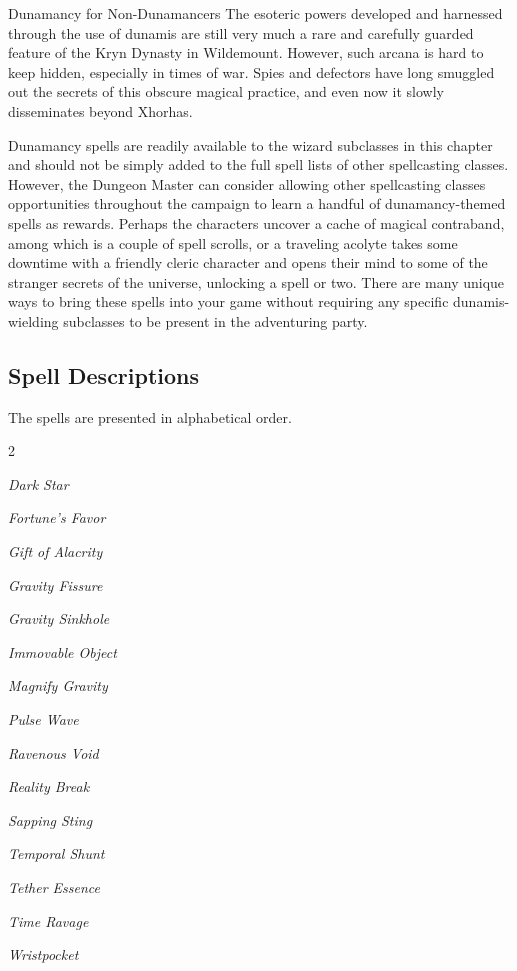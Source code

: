 \documentclass[10pt,a4paper,twoside,bg=print,twocolumn,openany,nodeprecatedcode]{dndbook}
\begin{document}
\begin{DndSidebar}[float=!b]{Dunamancy for Non-Dunamancers}
The esoteric powers developed and harnessed through the use of dunamis are still very much a rare and carefully guarded feature of the Kryn Dynasty in Wildemount. However, such arcana is hard to keep hidden, especially in times of war. Spies and defectors have long smuggled out the secrets of this obscure magical practice, and even now it slowly disseminates beyond Xhorhas.



Dunamancy spells are readily available to the wizard subclasses in this chapter and should not be simply added to the full spell lists of other spellcasting classes. However, the Dungeon Master can consider allowing other spellcasting classes opportunities throughout the campaign to learn a handful of dunamancy-themed spells as rewards. Perhaps the characters uncover a cache of magical contraband, among which is a couple of spell scrolls, or a traveling acolyte takes some downtime with a friendly cleric character and opens their mind to some of the stranger secrets of the universe, unlocking a spell or two. There are many unique ways to bring these spells into your game without requiring any specific dunamis-wielding subclasses to be present in the adventuring party.



\end{DndSidebar}

\subsection{Spell Descriptions}
The spells are presented in alphabetical order.


\begin{itemize}
\begin{multicols}{2}
\item \textit{Dark Star}
\item \textit{Fortune's Favor}
\item \textit{Gift of Alacrity}
\item \textit{Gravity Fissure}
\item \textit{Gravity Sinkhole}
\item \textit{Immovable Object}
\item \textit{Magnify Gravity}
\item \textit{Pulse Wave}
\item \textit{Ravenous Void}
\item \textit{Reality Break}
\item \textit{Sapping Sting}
\item \textit{Temporal Shunt}
\item \textit{Tether Essence}
\item \textit{Time Ravage}
\item \textit{Wristpocket}
\end{multicols}

\end{itemize}
\end{document}
